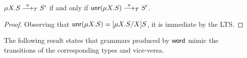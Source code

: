 
\begin{lemma}
  \label{lemma:unravelling}
  $\mu X. S \LTSderives[a] S'$ if and only if $\Unravel (\mu X. S) \LTSderives[a] S'$.
\end{lemma}
%
\begin{proof}
	Observing that $\Unravel(\mu X. S) = \subs{\mu X.S}{X}{S}$,
	it is immediate by the LTS.
\end{proof}

%

The following result states that grammars produced by
$\word$ mimic the transitions of the corresponding types
and vice-versa.

\newcommand{\grmcontext}{
  $(\vec X, \productions') = \grm(S, \emptyset)$ and 
  $(\vec Y, \productions) = \grm(T, \productions')$%
}

